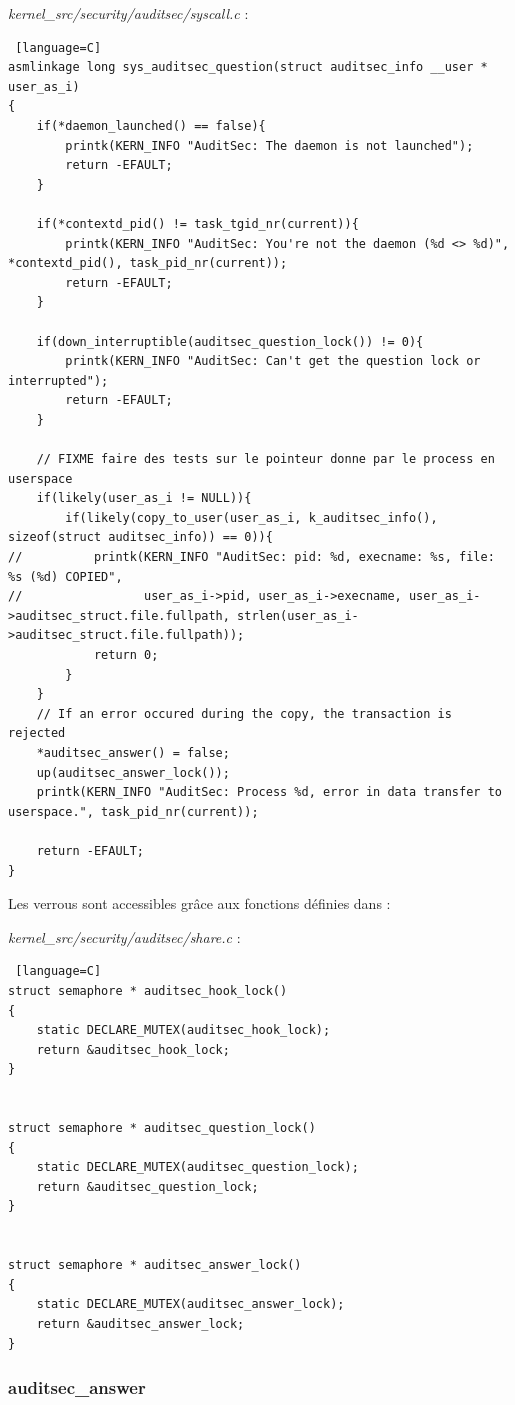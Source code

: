 \documentclass[pdftex,a4paper,titlepage,11pt]{article}
\begin{document}
\textit{{kernel\_src}/security/auditsec/syscall.c} :
\begin{lstlisting} [language=C]
asmlinkage long sys_auditsec_question(struct auditsec_info __user * user_as_i)
{
	if(*daemon_launched() == false){
		printk(KERN_INFO "AuditSec: The daemon is not launched");
		return -EFAULT;
	}

	if(*contextd_pid() != task_tgid_nr(current)){
		printk(KERN_INFO "AuditSec: You're not the daemon (%d <> %d)", *contextd_pid(), task_pid_nr(current));
		return -EFAULT;
	}

	if(down_interruptible(auditsec_question_lock()) != 0){
		printk(KERN_INFO "AuditSec: Can't get the question lock or interrupted");
		return -EFAULT;
	}

	// FIXME faire des tests sur le pointeur donne par le process en userspace
	if(likely(user_as_i != NULL)){
		if(likely(copy_to_user(user_as_i, k_auditsec_info(), sizeof(struct auditsec_info)) == 0)){
// 			printk(KERN_INFO "AuditSec: pid: %d, execname: %s, file: %s (%d) COPIED",
//				   user_as_i->pid, user_as_i->execname, user_as_i->auditsec_struct.file.fullpath, strlen(user_as_i->auditsec_struct.file.fullpath));
			return 0;
		}
	}
	// If an error occured during the copy, the transaction is rejected
	*auditsec_answer() = false;
	up(auditsec_answer_lock());
	printk(KERN_INFO "AuditSec: Process %d, error in data transfer to userspace.", task_pid_nr(current));

	return -EFAULT;
}
\end{lstlisting}

Les verrous sont accessibles grâce aux fonctions définies dans :

\textit{{kernel\_src}/security/auditsec/share.c} :
\begin{lstlisting} [language=C]
struct semaphore * auditsec_hook_lock()
{
	static DECLARE_MUTEX(auditsec_hook_lock);
	return &auditsec_hook_lock;
}


struct semaphore * auditsec_question_lock()
{
	static DECLARE_MUTEX(auditsec_question_lock);
	return &auditsec_question_lock;
}


struct semaphore * auditsec_answer_lock()
{
	static DECLARE_MUTEX(auditsec_answer_lock);
	return &auditsec_answer_lock;
}
\end{lstlisting}

\subsubsection{auditsec\_answer}
\end{document}
